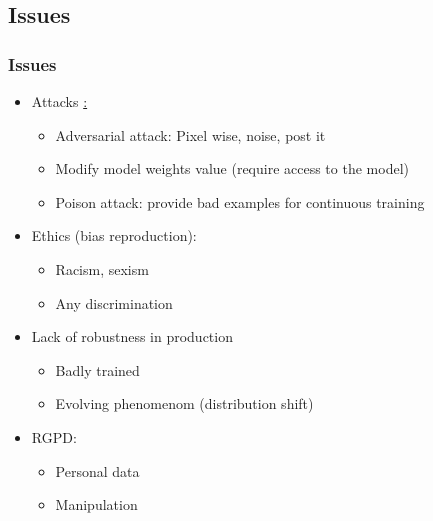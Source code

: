 \subsection{Issues}
\begin{frame}\frametitle{Issues}
   \begin{itemize}
      \item Attacks \href{https://viso.ai/deep-learning/adversarial-machine-learning/}:
      \begin{itemize}
         \item Adversarial attack: Pixel wise, noise, post it
         \item Modify model weights value (require access to the model)
         \item Poison attack: provide bad examples for continuous training
      \end{itemize}
      \item Ethics (bias reproduction):
      \begin{itemize}
         \item Racism, sexism
         \item Any discrimination
      \end{itemize}
      \item Lack of robustness in production
      \begin{itemize}
         \item Badly trained
         \item Evolving phenomenom (distribution shift)
      \end{itemize}
      \item RGPD:
      \begin{itemize}
         \item Personal data
         \item Manipulation
      \end{itemize}
   \end{itemize}
\end{frame}



